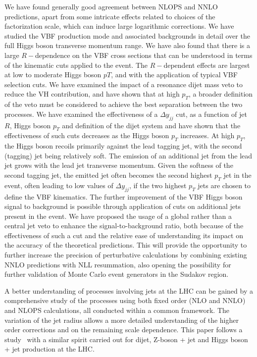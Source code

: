\documentclass[10pt,prd,fleqn,superscriptaddress,notitlepage,nofootinbib,preprintnumbers,nobalancelastpage]{revtex4-1}
\newcommand{\VBF}{VBF\xspace}
\newcommand{\VH}{VH\xspace}
\begin{document}
We have found generally good agreement between NLOPS and NNLO predictions, apart from some intricate effects related to choices of the factorization scale, which can induce large logarithmic corrections.   We have studied the \VBF production mode and associated backgrounds in detail over the full Higgs boson transverse momentum range. We have also found that there is a large $R-$dependence on the \VBF cross sections  that can be understood in terms of the kinematic  cuts applied to the event. The $R-$dependent effects are largest at low to moderate Higgs boson $pT$, and with the application of typical \VBF selection cuts.  We have examined the impact of a resonance dijet mass veto to reduce the \VH contribution, and have shown that at high $p_T$, a broader definition of the veto must be considered to achieve the best separation between the two processes. We have examined the effectiveness of a $\Delta y_{jj}$ cut, as a function of jet $R$, Higgs boson $p_T$ and definition of the dijet system and have shown that the effectiveness of such cuts decreases as the Higgs boson $p_T$ increases. At high $p_T$, the Higgs boson recoils primarily against the lead tagging jet, with the second (tagging) jet being relatively soft. The emission of an additional jet from the lead jet grows with the lead jet transverse momentum. Given the softness of the second tagging jet, the emitted jet often becomes the second highest $p_T$ jet in the event, often leading to low values of $\Delta y_{jj}$, if the two highest $p_T$ jets are chosen to define the \VBF kinematics.  The further improvement of the \VBF Higgs boson signal to background is possible through application of cuts on additional jets present in the event. We  have proposed the usage of a global rather than a central jet veto to enhance the signal-to-background ratio, both because of the effectiveness of such a cut and the relative ease of understanding its impact on the accuracy of the theoretical predictions. This will provide the opportunity to further increase the  precision of perturbative calculations by combining existing NNLO predictions with NLL resummation, also opening the possibility for further validation of Monte Carlo event generators in the Sudakov region.

A better understanding of processes involving jets at the LHC can be gained by a comprehensive study of the processes using both fixed order (NLO and NNLO) and NLOPS calculations, all conducted within a common framework. The variation of the jet radius allows a more detailed understanding of the higher order corrections and on the remaining scale dependence. This paper follows a study~\cite{Bellm:2019yyh} with a similar spirit carried out for dijet, Z-boson + jet and Higgs boson + jet production at the LHC.
\end{document}
